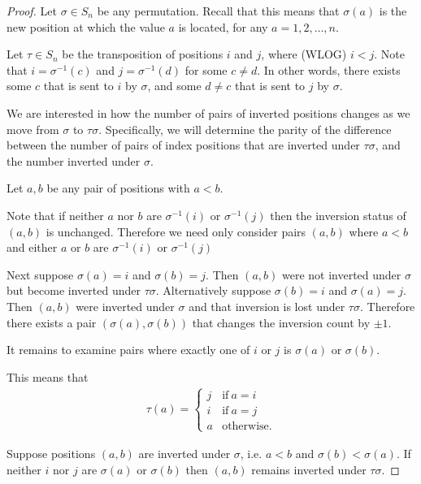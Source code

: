 \begin{proof}
  Let $\sigma \in S_n$ be any permutation. Recall that this means that $\sigma(a)$ is the new position at which
  the value $a$ is located, for any $a = 1, 2, \ldots, n$.

  Let $\tau \in S_n$ be the transposition of positions $i$ and $j$, where (WLOG) $i < j$. Note
  that $i = \sigma^{-1}(c)$ and $j = \sigma^{-1}(d)$ for some $c \neq d$. In other words, there exists some
  $c$ that is sent to $i$ by $\sigma$, and some $d \neq c$ that is sent to $j$ by $\sigma$.

  We are interested in how the number of pairs of inverted positions changes as we move from
  $\sigma$ to $\tau\sigma$. Specifically, we will determine the parity of the difference between the number of
  pairs of index positions that are inverted under $\tau\sigma$, and the number inverted under $\sigma$.

  Let $a, b$ be any pair of positions with $a < b$.

  Note that if neither $a$ nor $b$ are $\sigma^{-1}(i)$ or $\sigma^{-1}(j)$ then the inversion status
  of $(a, b)$ is unchanged. Therefore we need only consider pairs $(a, b)$ where $a < b$ and
  either $a$ or $b$ are $\sigma^{-1}(i)$ or $\sigma^{-1}(j)$

  Next suppose $\sigma(a) = i$ and $\sigma(b) = j$. Then $(a, b)$ were not inverted under $\sigma$ but become
  inverted under $\tau\sigma$. Alternatively suppose $\sigma(b) = i$ and $\sigma(a) = j$. Then
  $(a, b)$ were inverted under $\sigma$ and that inversion is lost under $\tau\sigma$. Therefore there exists a
  pair $(\sigma(a), \sigma(b))$ that changes the inversion count by $\pm1$.


  It remains to examine pairs where exactly one of $i$ or $j$ is $\sigma(a)$ or $\sigma(b)$.





 This means
  that
  \begin{align*}
    \tau(a) =
    \begin{cases}
      j &\text{if}~a = i\\
      i &\text{if}~a = j\\
      a &\text{otherwise}.
    \end{cases}
  \end{align*}




  Suppose positions $(a, b)$ are inverted under $\sigma$, i.e. $a < b$ and $\sigma(b) < \sigma(a)$. If neither
  $i$ nor $j$ are $\sigma(a)$ or $\sigma(b)$ then $(a, b)$ remains inverted under $\tau\sigma$.



\end{proof}
